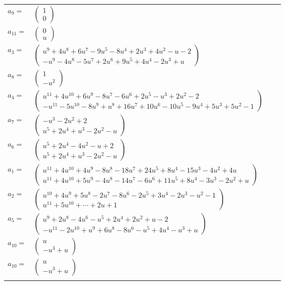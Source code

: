 \documentclass[1p]{elsarticle_modified}
\theoremstyle{definition}
\begin{document}
\begin{tabular}{m{7pt} m{180pt} m{7pt} m{180pt} }
\flushright $a_{9}=$&$\begin{pmatrix}1\\0\end{pmatrix}$ \\
\flushright $a_{11}=$&$\begin{pmatrix}0\\u\end{pmatrix}$ \\
\flushright $a_{3}=$&$\begin{pmatrix}u^9+4 u^8+6 u^7-9 u^5-8 u^4+2 u^3+4 u^2- u-2\\- u^9-4 u^8-5 u^7+2 u^6+9 u^5+4 u^4-2 u^3+u\end{pmatrix}$ \\
\flushright $a_{8}=$&$\begin{pmatrix}1\\- u^2\end{pmatrix}$ \\
\flushright $a_{4}=$&$\begin{pmatrix}u^{11}+4 u^{10}+6 u^9-8 u^7-6 u^6+2 u^5- u^3+2 u^2-2\\- u^{11}-5 u^{10}-8 u^9+u^8+16 u^7+10 u^6-10 u^5-9 u^4+5 u^3+5 u^2-1\end{pmatrix}$ \\
\flushright $a_{7}=$&$\begin{pmatrix}- u^3-2 u^2+2\\u^5+2 u^4+u^3-2 u^2- u\end{pmatrix}$ \\
\flushright $a_{6}=$&$\begin{pmatrix}u^5+2 u^4-4 u^2- u+2\\u^5+2 u^4+u^3-2 u^2- u\end{pmatrix}$ \\
\flushright $a_{1}=$&$\begin{pmatrix}u^{11}+4 u^{10}+4 u^9-8 u^8-18 u^7+24 u^5+8 u^4-15 u^3-4 u^2+4 u\\u^{11}+4 u^{10}+5 u^9-4 u^8-14 u^7-6 u^6+11 u^5+8 u^4-3 u^3-2 u^2+u\end{pmatrix}$ \\
\flushright $a_{2}=$&$\begin{pmatrix}u^{10}+4 u^9+5 u^8-2 u^7-8 u^6-2 u^5+3 u^4-2 u^3- u^2-1\\u^{11}+5 u^{10}+\cdots+2 u+1\end{pmatrix}$ \\
\flushright $a_{5}=$&$\begin{pmatrix}u^9+2 u^8-4 u^6- u^5+2 u^4+2 u^2+u-2\\- u^{11}-2 u^{10}+u^9+6 u^8-8 u^6- u^5+4 u^4- u^3+u\end{pmatrix}$ \\
\flushright $a_{10}=$&$\begin{pmatrix}u\\- u^3+u\end{pmatrix}$\\ \flushright $a_{10}=$&$\begin{pmatrix}u\\- u^3+u\end{pmatrix}$\\&\end{tabular}
\end{document}
